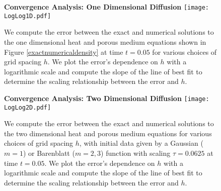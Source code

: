 \documentclass[11pt,leqno]{amsart}
\theoremstyle{definition}
\begin{document}
\begin{figure}[!ht]
\centering
\textbf{Convergence Analysis: One Dimensional Diffusion}
\hspace*{-1.2cm}
\texttt{[image: LogLog1D.pdf]}
	\caption{We compute the error between the exact and numerical solutions to the one dimensional heat and porous medium equations shown in Figure \ref{exactnumericaldensity} at time $t = 0.05$ for various choices of grid spacing $h$. We plot the error's dependence on $h$ with a logarithmic scale and compute the slope of the line of best fit to determine the scaling relationship between the error and $h$. \label{1Dloglog}}
\end{figure}

\begin{figure}[!ht]
\centering
\textbf{Convergence Analysis: Two Dimensional Diffusion}
\hspace*{-1.2cm}
\texttt{[image: LogLog2D.pdf]}
	\caption{We compute the error between the exact and numerical solutions to the two dimensional heat and porous medium equations  for various choices of grid spacing $h$, with initial data given by a Gaussian ($m=1$) or Barenblatt ($m=2, 3$) function with scaling $\tau = 0.0625$ at time $t = 0.05$. We plot the error's dependence on $h$ with a logarithmic scale and compute the slope of the line of best fit to determine the scaling relationship between the error and $h$.} \label{2Dloglog}
\end{figure}
\end{document}
